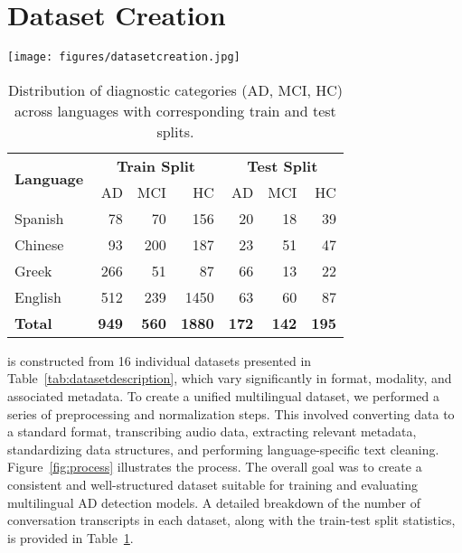 \section{Dataset Creation}
\label{sec:dataset}

\begin{figure*}[t]
    \centering
    \texttt{[image: figures/datasetcreation.jpg]} 
    \caption{Flowchart illustrating the process of dataset generation. }
    \label{fig:process}
\end{figure*}




\begin{table}[t]  
  \caption{Distribution of diagnostic categories (AD, MCI, HC) across languages with corresponding train and test splits. } %
  \captionshrink
  \centering
  \begin{tabular}{l|rrr|rrr}
    \toprule
    \multirow{2}{*}{\textbf{Language}} &  \multicolumn{3}{c|}{\textbf{Train Split}} & \multicolumn{3}{c}{\textbf{Test Split}} \\
    &  AD & MCI & HC & AD & MCI & HC \\
    \midrule
    Spanish &   78 & 70 & 156 &  20 & 18 & 39 \\
    Chinese &   93  & 200 & 187 &  23 & 51&47 \\
    Greek   &   266 & 51 & 87 & 66 & 13 & 22 \\
    English &  512 & 239 & 1450 & 63 & 60 & 87 \\
     \midrule
    \textbf{Total} &  \textbf{949} & \textbf{560} & \textbf{1880} & \textbf{172} & \textbf{142} & \textbf{195} \\
    \bottomrule
  \end{tabular}
  \label{tab:statistics_table}
\end{table}


\dataset{} is constructed from 16 individual datasets presented in Table~\ref{tab:datasetdescription}, which vary significantly in format, modality, and associated metadata. To create a unified multilingual dataset, we performed a series of preprocessing and normalization steps. This involved converting data to a standard format, transcribing audio data, extracting relevant metadata, standardizing data structures, and performing language-specific text cleaning. Figure~\ref{fig:process} illustrates the process. The overall goal was to create a consistent and well-structured dataset suitable for training and evaluating multilingual AD detection models.
A detailed breakdown of the number of conversation transcripts in each dataset, along with the train-test split statistics, is provided in Table~\ref{tab:statistics_table}.

